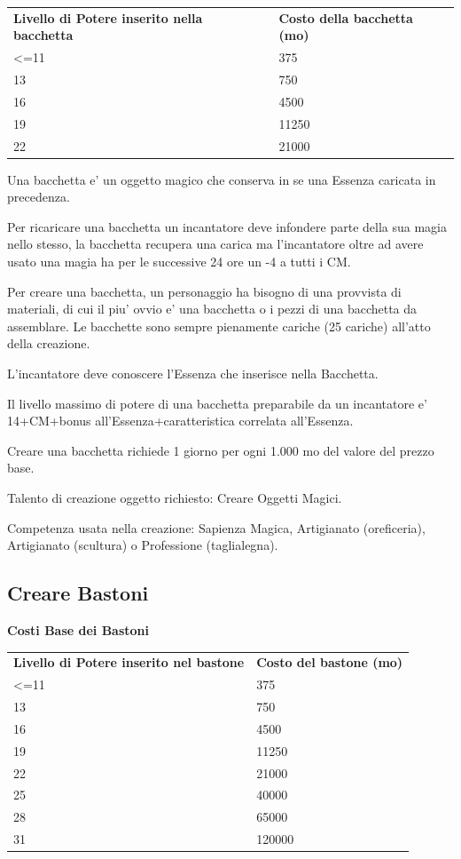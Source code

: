 \documentclass[a4paper,11pt,twoside,openany]{book}
\begin{document}
{\begin{tabular}{ll}
\toprule
\textbf{Livello di Potere inserito nella bacchetta} & \textbf{Costo della bacchetta (mo)}\tabularnewline
\textless=11 & 375\tabularnewline
13 & 750\tabularnewline
16 & 4500\tabularnewline
19 & 11250\tabularnewline
22 & 21000\tabularnewline
\end{tabular}

\bigskip

Una bacchetta e' un oggetto magico che conserva in se una Essenza caricata in precedenza.

Per ricaricare una bacchetta un incantatore deve infondere parte della sua magia nello stesso, la bacchetta recupera una carica ma l'incantatore oltre ad avere usato una magia ha per le successive 24 ore un -4 a tutti i CM.

Per creare una bacchetta, un personaggio ha bisogno di una provvista di materiali, di cui il piu' ovvio e' una bacchetta o i pezzi di una bacchetta da assemblare. Le bacchette sono sempre pienamente cariche (25 cariche) all'atto della creazione.

L'incantatore deve conoscere l'Essenza che inserisce nella Bacchetta.

Il livello massimo di potere di una bacchetta preparabile da un incantatore e' 14+CM+bonus all'Essenza+caratteristica correlata all'Essenza.

Creare una bacchetta richiede 1 giorno per ogni 1.000 mo del valore del prezzo base.

Talento di creazione oggetto richiesto: Creare Oggetti Magici.

Competenza usata nella creazione: Sapienza Magica, Artigianato (oreficeria),
Artigianato (scultura) o Professione (taglialegna).

\subsection{Creare Bastoni}

\textbf{Costi Base dei Bastoni}

\bigskip

\begin{tabular}{ll}
\toprule
\textbf{Livello di Potere inserito nel bastone} & \textbf{Costo del bastone (mo)}\tabularnewline
\textless=11 & 375\tabularnewline
13 & 750\tabularnewline
16 & 4500\tabularnewline
19 & 11250\tabularnewline
22 & 21000\tabularnewline
25 & 40000\tabularnewline
28 & 65000\tabularnewline
31 & 120000\tabularnewline
\end{tabular}

}
\end{document}
